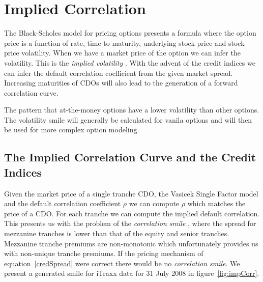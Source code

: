 \section{Implied Correlation}

The Black-Scholes model for pricing options presents a formula where the option price is a function of rate, time to maturity, underlying stock price and stock price volatility. When we have a market price of the option we can infer the volatility. This is the {\em implied volatility }. With the advent of the credit indices we can infer the default correlation coefficient from the given market spread.  Increasing maturities of CDOs will also lead to the generation of a forward correlation curve.


\begin{definition}
\begin{rm}
The pattern that at-the-money options have a lower volatility than other options. The volatility smile will generally be calculated for vanila options and will then be used for more complex option modeling.
\end{rm}
\end{definition}

\subsection{The Implied Correlation Curve and the Credit Indices}

Given the market price of a single tranche CDO, the Vasicek Single Factor model and the default correlation coefficient $\rho$ we can compute $\rho$ which matches the price of a CDO.  For each tranche we can compute the implied default correlation.  This presents us with the problem of the { \em correlation smile }, where the spread for mezzanine tranches is lower than that of the equity and senior tranches.  Mezzanine tranche premiums are non-monotonic which unfortunately provides us with non-unique tranche premiums. If the pricing mechanism of equation~\eqref{credSpread} were correct there would be no { \em correlation smile}. We present a generated smile for iTraxx data for 31 July 2008 in figure~\ref{fig:impCorr}.

